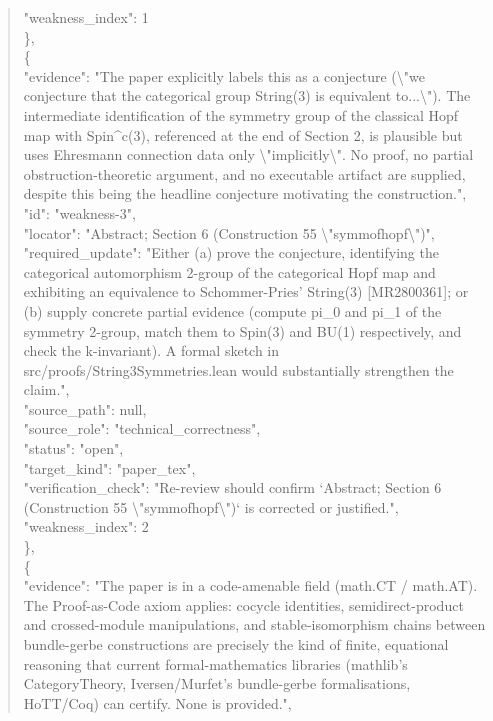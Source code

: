 \documentclass[11pt]{article}
\begin{document}
\begin{quote}
      "weakness\_index": 1\\
    \},\\
    \{\\
      "evidence": "The paper explicitly labels this as a conjecture (\textbackslash{}"we conjecture that the categorical group String(3) is equivalent to...\textbackslash{}"). The intermediate identification of the symmetry group of the classical Hopf map with Spin\^{}c(3), referenced at the end of Section 2, is plausible but uses Ehresmann connection data only \textbackslash{}"implicitly\textbackslash{}". No proof, no partial obstruction-theoretic argument, and no executable artifact are supplied, despite this being the headline conjecture motivating the construction.",\\
      "id": "weakness-3",\\
      "locator": "Abstract; Section 6 (Construction 55 \textbackslash{}"symmofhopf\textbackslash{}")",\\
      "required\_update": "Either (a) prove the conjecture, identifying the categorical automorphism 2-group of the categorical Hopf map and exhibiting an equivalence to Schommer-Pries' String(3) [MR2800361]; or (b) supply concrete partial evidence (compute pi\_0 and pi\_1 of the symmetry 2-group, match them to Spin(3) and BU(1) respectively, and check the k-invariant). A formal sketch in src/proofs/String3Symmetries.lean would substantially strengthen the claim.",\\
      "source\_path": null,\\
      "source\_role": "technical\_correctness",\\
      "status": "open",\\
      "target\_kind": "paper\_tex",\\
      "verification\_check": "Re-review should confirm `Abstract; Section 6 (Construction 55 \textbackslash{}"symmofhopf\textbackslash{}")` is corrected or justified.",\\
      "weakness\_index": 2\\
    \},\\
    \{\\
      "evidence": "The paper is in a code-amenable field (math.CT / math.AT). The Proof-as-Code axiom applies: cocycle identities, semidirect-product and crossed-module manipulations, and stable-isomorphism chains between bundle-gerbe constructions are precisely the kind of finite, equational reasoning that current formal-mathematics libraries (mathlib's CategoryTheory, Iversen/Murfet's bundle-gerbe formalisations, HoTT/Coq) can certify. None is provided.",\\

\end{quote}
\end{document}
